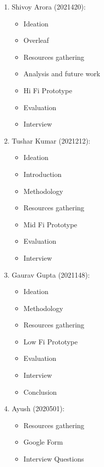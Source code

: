 \documentclass[acmtog]{acmart}
\begin{document}
\begin{enumerate}
    \item Shivoy Arora (2021420):
    \begin{itemize}
        \item Ideation
        \item Overleaf
        \item Resources gathering
        \item Analysis and future work
        \item Hi Fi Prototype
        \item Evaluation
        \item Interview
    \end{itemize}

    \item Tushar Kumar (2021212):
    \begin{itemize}
        \item Ideation
        \item Introduction
        \item Methodology
        \item Resources gathering
        \item Mid Fi Prototype
        \item Evaluation
        \item Interview
    \end{itemize}

    \item Gaurav Gupta (2021148):
    \begin{itemize}
        \item Ideation
        \item Methodology
        \item Resources gathering
        \item Low Fi Prototype
        \item Evaluation
        \item Interview
        \item Conclusion
    \end{itemize}

    \item Ayush (2020501):
    \begin{itemize}
        \item Resources gathering
        \item Google Form
        \item Interview Questions
    \end{itemize}


\end{enumerate}
\end{document}
